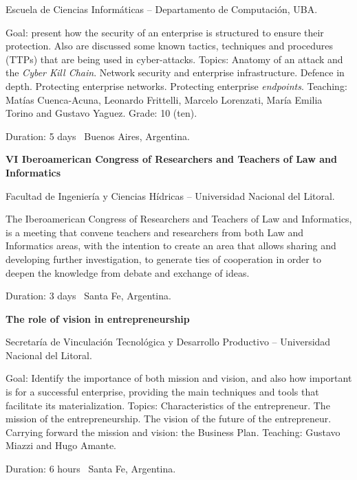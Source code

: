 \documentclass[letterpaper,MMMyyyy,nonstop]{simpleresumecv}
\begin{document}
\begin{body}
\BulletItem Escuela de Ciencias Informáticas – Departamento de Computación, UBA.
\begin{detail}
	\SubBulletItem
	Goal: present how the security of an enterprise is structured to ensure their protection. Also are discussed some known tactics, techniques and procedures (TTPs) that are being used in cyber-attacks.
	\SubBulletItem
	Topics: Anatomy of an attack and the \textit{Cyber Kill Chain}. Network security and enterprise infrastructure. Defence in depth. Protecting enterprise networks. Protecting enterprise \textit{endpoints}.
	\SubBulletItem
	Teaching: Matías Cuenca-Acuna, Leonardo Frittelli, Marcelo Lorenzati,  María  Emilia  Torino and Gustavo Yaguez.
	\SubBulletItem
	Grade: 10 (ten).
\end{detail}
Duration: 5 days \SubBulletSymbol\, Buenos Aires, Argentina.

\BigGap
\textbf{VI Iberoamerican Congress of Researchers and Teachers of Law and Informatics}
\hfill
{}

\BulletItem Facultad de Ingeniería y Ciencias Hídricas – Universidad Nacional del Litoral.
\begin{detail}
	\SubBulletItem
	The Iberoamerican Congress of Researchers and Teachers of Law and Informatics, is a meeting that convene teachers and researchers from both Law and Informatics areas, with the intention to create an area that allows sharing and developing further investigation, to generate ties of cooperation in order to deepen the knowledge from debate and exchange of ideas.
\end{detail}
Duration: 3 days \SubBulletSymbol\, Santa Fe, Argentina.

\BigGap
\textbf{The role of vision in entrepreneurship}
\hfill
{}

\BulletItem Secretaría de Vinculación Tecnológica y Desarrollo Productivo – Universidad Nacional del Litoral.
\begin{detail}
	\SubBulletItem
	Goal: Identify the importance of both mission and vision, and also how important is for a successful enterprise, providing the main techniques and tools that facilitate its materialization.
	\SubBulletItem
	Topics: Characteristics of the entrepreneur. The mission of the entrepreneurship. The vision of the future of the entrepreneur. Carrying forward the mission and vision: the Business Plan.
	\SubBulletItem
	Teaching: Gustavo Miazzi and Hugo Amante. 
\end{detail}
Duration: 6 hours \SubBulletSymbol\, Santa Fe, Argentina.


\end{body}
\end{document}
